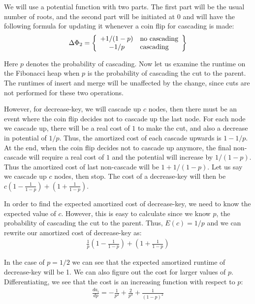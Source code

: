 \documentclass[psamsfonts]{amsart}
\newenvironment{sol}{{\bfseries Solution:}}{\qedsymbol}
\begin{document}
\begin{sol}
We will use a potential function with two parts. The first part will be the usual number of roots, and the second part will be initiated at 0 and will have the following formula for updating it whenever a coin flip for cascading is made:
\begin{equation}
\Delta \Phi_2 = \left\{
    \begin{array}{c l}
        +1/(1-p) & \text{no cascading} \\
        -1/p & \text{cascading} 
    \end{array}
\right\}
\end{equation}

Here $p$ denotes the probability of cascading. Now let us examine the runtime on the Fibonacci heap when $p$ is the probability of cascading the cut to the parent. The runtimes of insert and merge will be unaffected by the change, since cuts are not performed for these two operations.

However, for decrease-key, we will cascade up $c$ nodes, then there must be an event where the coin flip decides not to cascade up the last node. For each node we cascade up, there will be a real cost of $1$ to make the cut, and also a decrease in potential of $1/p$. Thus, the amortized cost of each cascade upwards is $1 - 1/p$. At the end, when the coin flip decides not to cascade up anymore, the final non-cascade will require a real cost of $1$ and the potential will increase by $1/(1-p)$. Thus the amortized cost of last non-cascade will be $1 + 1/(1-p)$. Let us say we cascade up $c$ nodes, then stop. The cost of a decrease-key will then be $c \left( 1 - \frac{1}{1-p} \right) + \left(1 + \frac{1}{1-p} \right)$.

In order to find the expected amortized cost of decrease-key, we need to know the expected value of $c$. However, this is easy to calculate since we know $p$, the probability of cascading the cut to the parent. Thus, $E(c) = 1/p$ and we can rewrite our amortized cost of decrease-key as:
\begin{eqnarray}
\frac{1}{p} \left( 1 - \frac{1}{1-p} \right) + \left(1 + \frac{1}{1-p} \right)
\end{eqnarray}

In the case of $p = 1/2$ we can see that the expected amortized runtime of decrease-key will be 1. We can also figure out the cost for larger values of $p$. Differentiating, we see that the cost is an increasing function with respect to $p$:
\begin{eqnarray}
\frac{d a_i}{dp} = - \frac{1}{p^2} + \frac{2}{p^3} + \frac{1}{(1-p)^2}
\end{eqnarray}


\end{sol}
\end{document}
